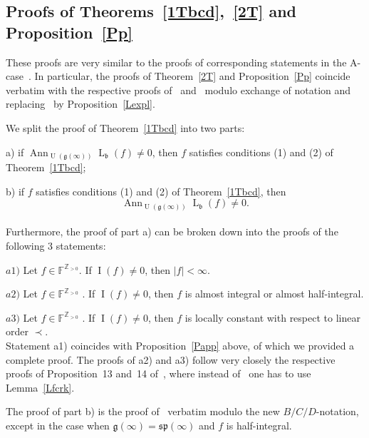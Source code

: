 \documentclass{emsprocart}
\begin{document}
\subsection{Proofs of Theorems~\ref{1Tbcd},~\ref{2T} and Proposition~\ref{Pp}}\label{Spr1tb}
These proofs are very similar to the proofs of corresponding statements in the A-case~\cite[Theorems 3.1, 3.2 and Proposition 3.3]{PP2}.
In particular, the proofs of Theorem~\ref{2T} and Proposition~\ref{Pp} coincide verbatim with the respective proofs of~\cite[Theorem~3.2]{PP2} and~\cite[Proposition~3.3]{PP2} modulo exchange of notation and replacing~\cite[Proposition 2.10]{PP2} by Proposition~\ref{Lexpl}.

We split the proof of Theorem~\ref{1Tbcd} into two parts:

a) if $\operatorname{Ann}_{\operatorname{U}(\mathfrak g(\infty))} \operatorname{L}_\mathfrak b(f) \ne 0$, then $f$ satisfies conditions (1) and (2) of Theorem~\ref{1Tbcd};

b) if $f$ satisfies conditions (1) and (2) of Theorem~\ref{1Tbcd}, then $$\operatorname{Ann}_{\operatorname{U}(\mathfrak g(\infty))} \operatorname{L}_\mathfrak b(f) \ne 0.$$\\
Furthermore, the proof of part a) can be broken down into the proofs of the following 3 statements:

$a1)$ Let $f\in\mathbb F^{\mathbb Z_{>0}}$. If $\operatorname{I}(f)\ne0$, then $|f|<\infty$.

$a2)$ Let $f\in\mathbb F^{\mathbb Z_{>0}}$ . If $\operatorname{I}(f)\ne0$, then $f$ is almost integral or almost half-integral.

$a3)$ Let $f\in\mathbb F^{\mathbb Z_{>0}}$ . If $\operatorname{I}(f)\ne0$, then $f$ is locally constant with
respect to linear order $\prec$.\\
Statement a1) coincides with Proposition~\ref{Papp} above, of which we provided a complete proof. The proofs of a2) and a3) follow very closely the respective proofs of Proposition~13 and~14 of~\cite{PP2}, where instead of~\cite[Lemma~18]{PP2} one has to use Lemma~\ref{Lfcrk}.

The proof of part b) is the proof of~\cite[Theorem 3.1 b)]{PP2} verbatim modulo the new $B/C/D$-notation, except in the case when $\mathfrak g(\infty)=\mathfrak{sp}(\infty)$ and $f$ is half-integral.
\end{document}
